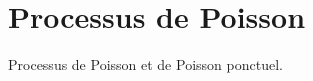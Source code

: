 \section{Processus de Poisson} \label{sec:Proba-Poisson}

Processus de Poisson et de Poisson ponctuel.

\todo{}
